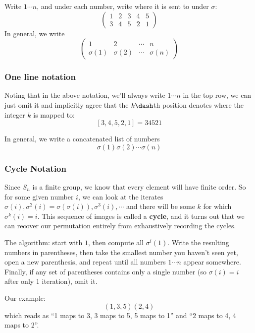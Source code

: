 Write \(1\cdots n\), and under each number, write where it is sent to
under \(\sigma\): \[
\left( \begin{array}{ccccc}
1 & 2 & 3 & 4 & 5 \\
3 & 4 & 5 & 2 & 1
\end{array}\right)
\] In general, we write \[
\left( \begin{array}{cccc}
1 & 2 & \cdots & n  \\
\sigma(1) & \sigma(2) & \cdots & \sigma(n)
\end{array}\right)
\]

\hypertarget{one-line-notation}{%
\subsubsection{One line notation}\label{one-line-notation}}

Noting that in the above notation, we'll always write \(1\cdots n\) in
the top row, we can just omit it and implicitly agree that the
\(k\dash\)th position denotes where the integer \(k\) is mapped to: \[
[3,4,5,2,1] = 34521
\]

In general, we write a concatenated list of numbers \[
\sigma(1)\sigma(2) \cdots \sigma(n)
\]

\hypertarget{cycle-notation}{%
\subsubsection{Cycle Notation}\label{cycle-notation}}

Since \(S_n\) is a finite group, we know that every element will have
finite order. So for some given number \(i\), we can look at the
iterates
\(\sigma(i), \sigma^2(i) = \sigma(\sigma(i)), \sigma^3(i), \cdots\) and
there will be some \(k\) for which \(\sigma^k(i) = i\). This sequence of
images is called a \textbf{cycle}, and it turns out that we can recover
our permutation entirely from exhaustively recording the cycles.

The algorithm: start with \(1\), then compute all \(\sigma^i(1)\). Write
the resulting numbers in parentheses, then take the smallest number you
haven't seen yet, open a new parenthesis, and repeat until all numbers
\(1 \cdots n\) appear somewhere. Finally, if any set of parentheses
contains only a single number (so \(\sigma(i) = i\) after only 1
iteration), omit it.

Our example: \[
(1,3,5)(2,4)
\] which reads as ``1 maps to 3, 3 maps to 5, 5 maps to 1'' and ``2 maps
to 4, 4 maps to 2''.

